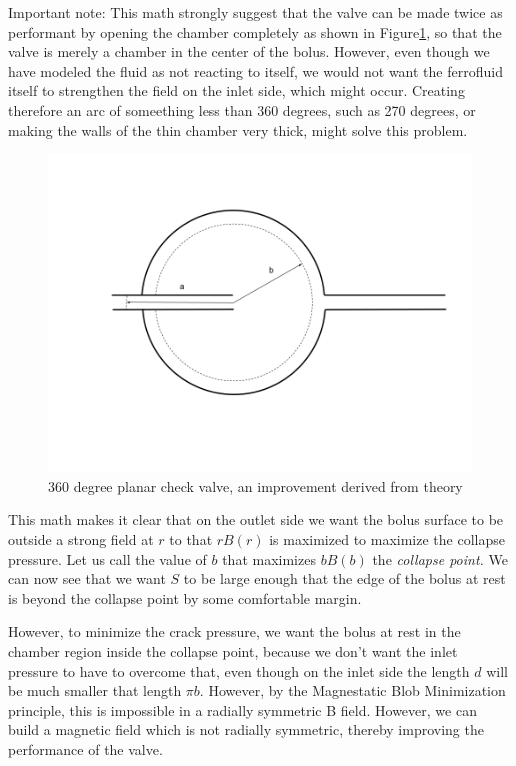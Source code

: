 \documentclass{asme2ej}
\begin{document}
Important note: This math strongly suggest that the valve can be
made twice as performant by opening the chamber completely as shown in Figure\ref{fig:360}, so that the
valve is merely a chamber in the center of the bolus.
However, even though we have modeled the fluid as not reacting to itself,
we would not want the ferrofluid itself
to strengthen the field on the inlet side, which might occur. Creating
therefore an arc of someething less than 360 degrees, such as 270 degrees,
or making the walls of the thin chamber very thick, might solve this problem.
\begin{figure}[H]
\centerline{\includegraphics[width=6in]{figure/360degreeplanarcheckvalve.png}}
\caption{360 degree planar check valve, an improvement derived from theory}
\label{fig:360}
\end{figure}
This math makes it clear that on the outlet side we want the
bolus surface to be outside a strong field at $r$ to that $r B(r)$ is
maximized to maximize the collapse pressure.
Let us call the value of $b$ that maximizes $b B(b)$ the {\em collapse point.}
We can now see that we want $S$ to be large enough that the edge
of the bolus at rest is beyond the collapse point by some
comfortable margin.

However, to minimize the crack pressure, we want the bolus at rest
in the chamber region inside
the collapse point, because we don't want the inlet pressure to have
to overcome that, even though on the inlet side the length $d$ will
be much smaller that length $\pi b$. However, by the
Magnestatic Blob Minimization principle, this is impossible in a
radially symmetric B field. However, we can build a magnetic field
which is not radially symmetric, thereby improving the performance of the valve.
\end{document}

